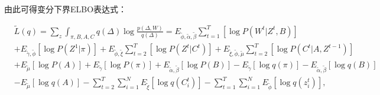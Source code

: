 


由此可得变分下界ELBO表达式：

\begin{equation}
\label{eq:3}
\begin{split}
&\widetilde{L}(q) = \sum_z \int_{\pi,B,A,C} q(\Delta) \log \frac{p(\Delta,W)}{q(\Delta)} 
= E_{\widetilde{\phi},\widetilde{\alpha},\widetilde{\beta}} \sum_{t=1}^T [\log P(W^t|Z^t,B)] \\
&+ E_{\widetilde{\gamma},\widetilde{\phi}}[\log P(Z^1|\pi)] + E_{\widetilde{\phi},\widetilde{\xi}} \sum_{t=2}^T [\log P(Z^t|C^t)] 
+ E_{\widetilde{\xi},\widetilde{\phi},\widetilde{\mu}} \sum_{t=2}^T [\log P(C^t|A,Z^{t-1})] \\
&+ E_{\widetilde{\mu}}[\log P(A)] + E_{\widetilde{\gamma}}[\log P(\pi)] + E_{\widetilde{\alpha},\widetilde{\beta}}[\log P(B)] 
- E_{\widetilde{\gamma}}[\log q(\pi)] - E_{\widetilde{\alpha},\widetilde{\beta}}[\log q(B)] \\
&- E_{\widetilde{\mu}}[\log q(A)] - \sum_{t=2}^T \sum_{i=1}^N E_{\widetilde{\xi}}[\log q(C_i^t)] - \sum_{t=1}^T \sum_{i=1}^N E_{\widetilde{\phi}}[\log q(z_i^t)] ,\\
\end{split}
\end{equation}

